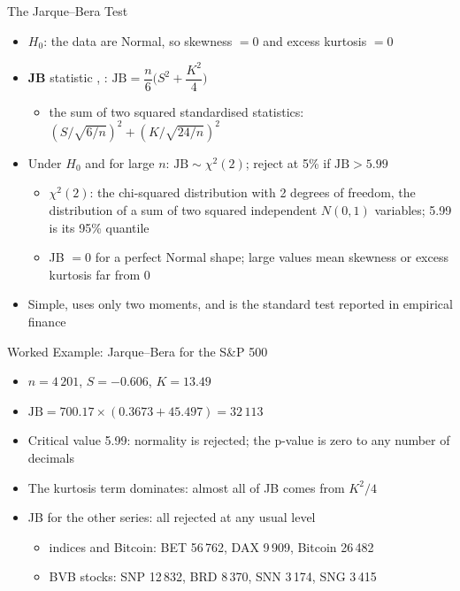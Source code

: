 \begin{frame}{The Jarque--Bera Test}
\itemsize{\small}
\begin{itemize}
    \item $H_0$: the data are Normal, so skewness $= 0$ and excess kurtosis $= 0$
    \item \textbf{JB} statistic , : $\text{JB} = \dfrac{n}{6}\Big(S^2 + \dfrac{K^2}{4}\Big)$
    \begin{itemize}
        \item the sum of two squared standardised statistics: $(S/\sqrt{6/n})^2 + (K/\sqrt{24/n})^2$
    \end{itemize}
    \item Under $H_0$ and for large $n$: $\text{JB} \sim \chi^2(2)$; reject at 5\% if $\text{JB} > 5.99$
    \begin{itemize}
        \item $\chi^2(2)$: the chi-squared distribution with 2 degrees of freedom, the distribution of a sum of two squared independent $N(0,1)$ variables; 5.99 is its 95\% quantile
        \item JB $= 0$ for a perfect Normal shape; large values mean skewness or excess kurtosis far from 0
    \end{itemize}
    \item Simple, uses only two moments, and is the standard test reported in empirical finance
\end{itemize}
\end{frame}

\begin{frame}{Worked Example: Jarque--Bera for the S\&P 500}
\itemsize{\small}
\begin{itemize}
    \item $n = 4\,201$, $S = -0.606$, $K = 13.49$
    \item $\text{JB} = 700.17 \times (0.3673 + 45.497) = 32\,113$
    \item Critical value 5.99: normality is rejected; the p-value is zero to any number of decimals
    \item The kurtosis term dominates: almost all of JB comes from $K^2/4$
    \item JB for the other series: all rejected at any usual level
    \begin{itemize}
        \item indices and Bitcoin: BET 56\,762, DAX 9\,909, Bitcoin 26\,482
        \item BVB stocks: SNP 12\,832, BRD 8\,370, SNN 3\,174, SNG 3\,415
    \end{itemize}
\end{itemize}
\end{frame}

